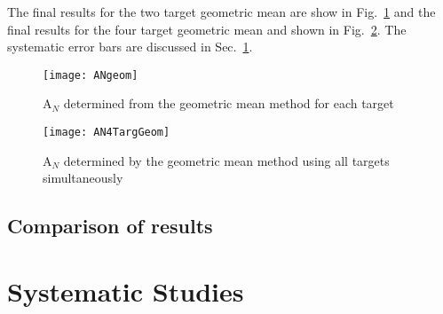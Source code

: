 \noindent
The final results for the two target geometric mean are show in
Fig.~\ref{fig::ANgeom} and the final results for the four target geometric mean
and shown in Fig.~\ref{fig::AN4TargGeom}.  The systematic error bars are
discussed in Sec.~\ref{sec::systematics}.

\begin{figure}
  \begin{center}
    \texttt{[image: ANgeom]}
    \caption{A$_N$ determined from the geometric mean method for each target}
    \label{fig::ANgeom}
  \end{center}
\end{figure}

\begin{figure}[h]
  \begin{center}
    \texttt{[image: AN4TargGeom]}
    \caption{A$_N$ determined by the geometric mean method using all targets
      simultaneously}
    \label{fig::AN4TargGeom}
  \end{center}
\end{figure}

\subsection{Comparison of results}

\section{Systematic Studies} \label{sec::systematics}
